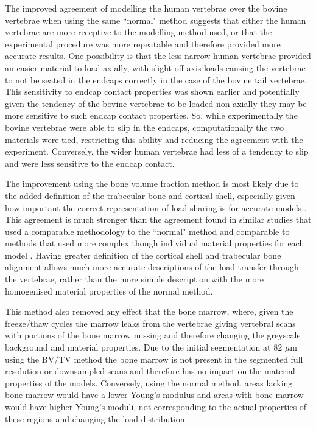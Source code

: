 The improved agreement of modelling the human vertebrae over the bovine
vertebrae when using the same ``normal" method suggests that either the human
vertebrae are more receptive to the modelling method used, or that the
experimental procedure was more repeatable and therefore provided more accurate
results. One possibility is that the less narrow human vertebrae provided an
easier material to load axially, with slight off axis loads causing the
vertebrae to not be seated in the endcaps correctly in the case of the bovine
tail vertebrae. This sensitivity to endcap contact properties was shown earlier
and potentially given the tendency of the bovine vertebrae to be loaded
non-axially they may be more sensitive to such endcap contact properties. So,
while experimentally the bovine vertebrae were able to slip in the endcaps,
computationally the two materials were tied, restricting this ability and
reducing the agreement with the experiment. Conversely, the wider human
vertebrae had less of a tendency to slip and were less sensitive to the endcap
contact.

The improvement using the bone volume fraction method is most likely due to the
added definition of the trabecular bone and cortical shell, especially given
how important the correct representation of load sharing is for accurate models
\cite{eswaran2006cortical}. This agreement is much stronger than the agreement
found in similar studies that used a comparable methodology to the ``normal"
method \cite{Wijayathunga2008, zapata2017methodology, RobsonBrown2014} and
comparable to methods that used more complex though individual material
properties for each model \cite{Kinzl2012,kinzl2013experimentally}.  Having
greater definition of the cortical shell and trabecular bone alignment allows
much more accurate descriptions of the load transfer through the vertebrae,
rather than the more simple description with the more homogenised material
properties of the normal method.

This method also removed any effect that the bone marrow, where, given the
freeze/thaw cycles the marrow leaks from the vertebrae giving vertebral scans
with portions of the bone marrow missing and therefore changing the greyscale
background and material properties.  Due to the initial segmentation at 82
$\mu$m using the BV/TV method the bone marrow is not present in the segmented
full resolution or downsampled scans and therefore has no impact on the
material properties of the models.  Conversely, using the normal method, areas
lacking bone marrow would have a lower Young's modulus and areas with bone
marrow would have higher Young's moduli, not corresponding to the actual
properties of these regions and changing the load distribution.

